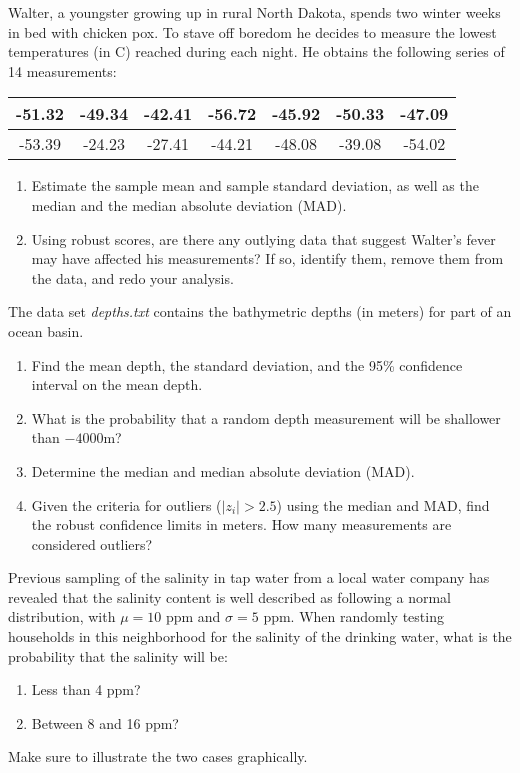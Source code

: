 \begin{problem}
Walter, a youngster growing up in rural North Dakota, spends two winter weeks in bed with chicken pox.
To stave off boredom he decides to measure the lowest temperatures (in \DS C) reached during each night.
He obtains the following series of 14 measurements:
\begin{table}[H]
	\centering
	\begin{tabular}{|c|c|c|c|c|c|c|} \hline
	-51.32 & -49.34 & -42.41 & -56.72 & -45.92 & -50.33 & -47.09 \\  \hline
	-53.39 & -24.23 & -27.41 & -44.21 & -48.08 & -39.08 & -54.02 \\  \hline
	\end{tabular}
\end{table}
\begin{enumerate}[label=\alph*)]
\item Estimate the sample mean and sample standard deviation, as well as
the median and the median absolute deviation (MAD).
\item Using robust scores, are there any outlying data that suggest 
Walter's fever may have affected his measurements?  If so, identify them,
remove them from the data, and redo your analysis.
\end{enumerate}
\end{problem}

\begin{problem}
The data set \emph{depths.txt} contains the bathymetric depths (in meters) for part of an ocean basin.
\begin{enumerate}[label=\alph*)]
\item Find the mean depth, the standard deviation, and the 95\% confidence interval on the mean depth.
\item What is the probability that a random depth measurement will be shallower than $-4000$m?
\item Determine the median and median absolute deviation (MAD).
\item Given the criteria for outliers ($|z_i| > 2.5$) using the median and MAD, find the robust confidence limits in meters.
How many measurements are considered outliers?
\end{enumerate}
\end{problem}

\begin{problem}
Previous sampling of the salinity in tap water from a local water company has
revealed that the salinity content is well described as following a normal distribution,
with $\mu = 10$ ppm and $\sigma = 5$ ppm.  When randomly testing households in this
neighborhood for the salinity of the drinking water, what is the probability that
the salinity will be:
\begin{enumerate}[label=\alph*)]
\item Less than 4 ppm?
\item Between 8 and 16 ppm?
\end{enumerate}
Make sure to illustrate the two cases graphically.
\end{problem}

